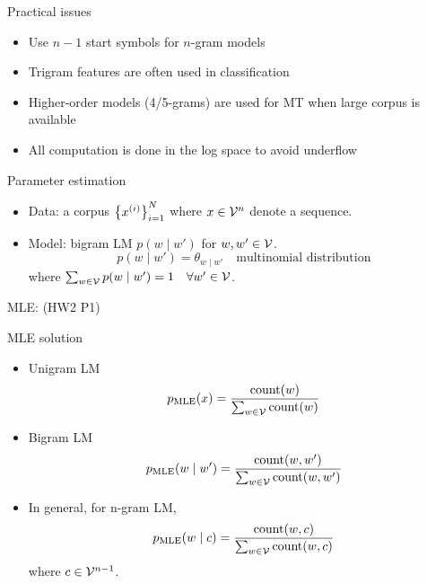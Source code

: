 \documentclass[usenames,dvipsnames,notes,11pt,aspectratio=169]{beamer}
\begin{document}
\begin{frame}
    {Practical issues}
    \begin{itemize}
        \itemsep1em
        \item Use $n-1$ start symbols for $n$-gram models
        \item Trigram features are often used in classification
        \item Higher-order models (4/5-grams) are used for MT when large corpus is available
        \item All computation is done in the log space to avoid underflow
    \end{itemize}
\end{frame}

\begin{frame}
    {Parameter estimation}
    \begin{itemize}
        \itemsep1em
        \item Data: a corpus $\left\{ x^{(i)} \right\}_{i=1}^N$ where $x\in\mathcal{V}^n$ denote a sequence.
        \item Model: bigram LM $p(w\mid w')$ for $w,w'\in\mathcal{V}$.
            $$
            p(w\mid w') = \theta_{w\mid w'} \quad \text{multinomial distribution}
            $$
            where $\sum_{w\in\mathcal{V}}p(w\mid w') = 1 \quad \forall w'\in\mathcal{V}$.
    \end{itemize}

    MLE: (HW2 P1)\\
    \gray{[board]} 
\end{frame}

\begin{frame}
    {MLE solution}
    \begin{itemize}
        \itemsep1em
        \item Unigram LM
            $$
            {p}_{\text{MLE}}(x) = \frac{\text{count}(w)}{\sum_{w\in\mathcal{V}}\text{count}(w)}
            $$
        \item Bigram LM
            $$
            {p}_{\text{MLE}}(w\mid w') =
            \frac{\text{count}(w,w')}{\sum_{w\in\mathcal{V}}\text{count}(w,w')}
            $$
        \item In general, for n-gram LM,
            $$
            {p}_{\text{MLE}}(w\mid c) =
            \frac{\text{count}(w,c)}{\sum_{w\in\mathcal{V}}\text{count}(w,c)}
            $$
            where $c\in \mathcal{V}^{n-1}$.
    \end{itemize}
\end{frame}
\end{document}
